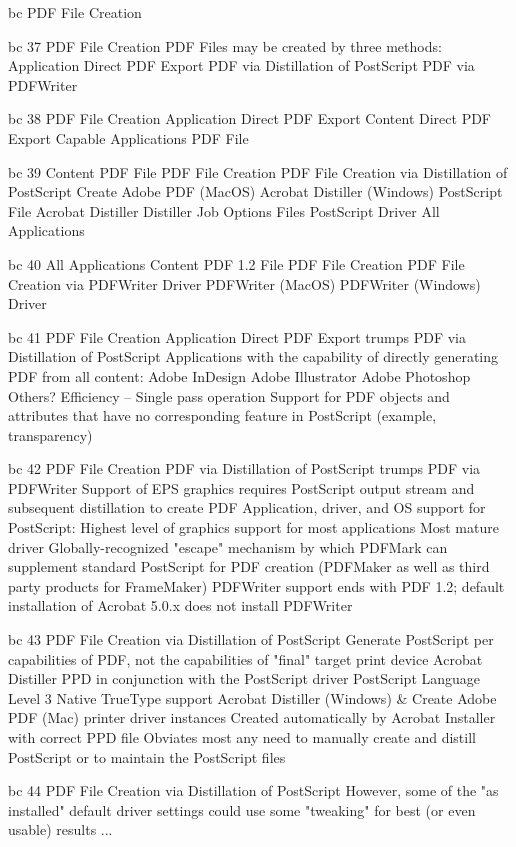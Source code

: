 \documentclass[11pt,a4paper]{article}
\begin{document}
bc PDF File Creation

bc 37 PDF File Creation PDF Files may be created by three methods: Application Direct PDF Export PDF via Distillation of PostScript PDF via PDFWriter

bc 38 PDF File Creation Application Direct PDF Export Content Direct PDF Export Capable Applications PDF File

bc 39 Content PDF File PDF File Creation PDF File Creation via Distillation of PostScript Create Adobe PDF (MacOS) Acrobat Distiller (Windows) PostScript File Acrobat Distiller Distiller Job Options Files PostScript Driver All Applications

bc 40 All Applications Content PDF 1.2 File PDF File Creation PDF File Creation via PDFWriter Driver PDFWriter (MacOS) PDFWriter (Windows) Driver

bc 41 PDF File Creation Application Direct PDF Export trumps PDF via Distillation of PostScript Applications with the capability of directly generating PDF from all content: Adobe InDesign Adobe Illustrator Adobe Photoshop Others? Efficiency -- Single pass operation Support for PDF objects and attributes that have no corresponding feature in PostScript (example, transparency)

bc 42 PDF File Creation PDF via Distillation of PostScript trumps PDF via PDFWriter Support of EPS graphics requires PostScript output stream and subsequent distillation to create PDF Application, driver, and OS support for PostScript: Highest level of graphics support for most applications Most mature driver Globally-recognized "escape" mechanism by which PDFMark can supplement standard PostScript for PDF creation (PDFMaker as well as third party products for FrameMaker) PDFWriter support ends with PDF 1.2; default installation of Acrobat 5.0.x does not install PDFWriter

bc 43 PDF File Creation via Distillation of PostScript Generate PostScript per capabilities of PDF, not the capabilities of "final" target print device Acrobat Distiller PPD in conjunction with the PostScript driver PostScript Language Level 3 Native TrueType support Acrobat Distiller (Windows) \& Create Adobe PDF (Mac) printer driver instances Created automatically by Acrobat Installer with correct PPD file Obviates most any need to manually create and distill PostScript or to maintain the PostScript files

bc 44 PDF File Creation via Distillation of PostScript However, some of the "as installed" default driver settings could use some "tweaking" for best (or even usable) results ...
\end{document}
